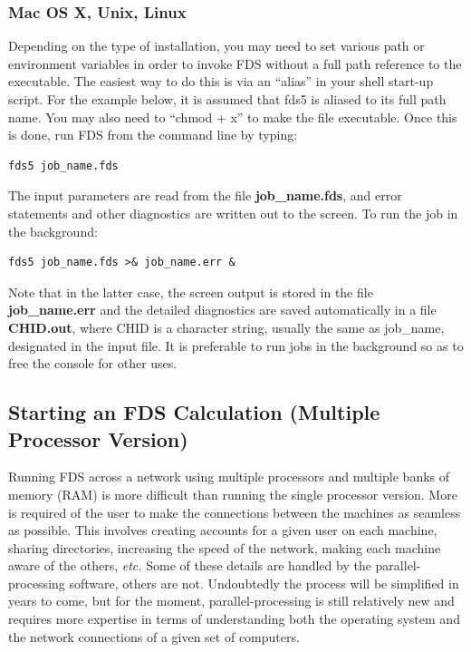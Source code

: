 \documentclass[11pt]{book}
\begin{document}
\subsubsection{Mac OS X, Unix, Linux}

Depending on the type of installation, you may need to set various path or environment variables in order to invoke
FDS without a full path reference to the executable. The easiest way to do this is via an ``alias'' in your shell start-up
script. For the example below, it is assumed that {\ct fds5} is aliased to its full path name.
You may also need to ``chmod + x'' to make the file executable. Once this is done, run FDS from the command line by typing:
\begin{verbatim}
fds5 job_name.fds
\end{verbatim}
The input parameters are read from the file {\bf job\_name.fds},
and error statements and other diagnostics are written out to the screen.
To run the job in the background:
\begin{verbatim}
fds5 job_name.fds >& job_name.err &
\end{verbatim}


\begin{warning}
\noindent
Note that in the latter case, the screen output is stored in the file {\bf job\_name.err} and the
detailed diagnostics are saved automatically in a file {\bf CHID.out}, where {\ct CHID} is a character
string, usually the same as {\ct job\_name}, designated in the input file.
It is preferable to run jobs in the background so as to free the console for other uses.
\end{warning}


\subsection{Starting an FDS Calculation (Multiple Processor Version)}
\label{info:parallelprocessing}

Running FDS across a network using multiple processors and multiple
banks of memory (RAM) is more difficult than running the single
processor version.  More is required of the user to make the
connections between the machines as seamless as possible. This
involves creating accounts for a given user on each machine, sharing
directories, increasing the speed of the network, making each machine
aware of the others, {\em etc.}  Some of these details are handled by
the parallel-processing software, others are not. Undoubtedly the
process will be simplified in years to come, but for the moment,
parallel-processing is still relatively new and requires more
expertise in terms of understanding both the operating system and the
network connections of a given set of computers.
\end{document}
